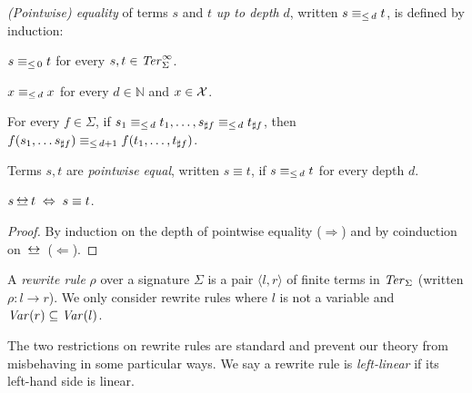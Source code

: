 \begin{definition}\label{def:equiv}%
\emph{(Pointwise) equality} of terms $s$ and $t$ \emph{up to depth} $d$,
written $s \equiv_{\le \, d} t$, is defined by induction:
\begin{compactenum}
  \item $s \equiv_{\le \, 0} t$ for every $s, t \in \mathit{Ter}_\Sigma^\infty$.
  \item $x \equiv_{\le \, d} x$ for every $d \in \mathbb{N}$ and $x \in \mathcal{X}$.
  \item For every $f \in \Sigma$, if $s_1 \equiv_{\le \, d} t_1, \ldots,
    s_{\sharp f} \equiv_{\le \, d} t_{\sharp f}$, then $f(s_1, \ldots
    s_{\sharp f}) \equiv_{\le \, d+1} f(t_1, \ldots, t_{\sharp f})$.
\end{compactenum}
Terms $s, t$ are \emph{pointwise equal}, written $s \equiv t$, if $s
\equiv_{\le \, d} t$ for every depth $d$.
\end{definition}

\begin{proposition}\label{prop:equalities}
$s \bis t \; \Leftrightarrow \; s \equiv t$.
\end{proposition}
\begin{proof}
By induction on the depth of pointwise equality ($\Rightarrow$) and
by coinduction on $\bis$ ($\Leftarrow$).
\end{proof}

\begin{definition}%
  A \emph{rewrite rule} $\rho$ over a signature $\Sigma$ is a pair
  $\langle l, r \rangle$ of finite terms in $\mathit{Ter}_\Sigma$ (written $\rho : l
  \rightarrow r$). We only consider rewrite rules where $l$
  is not a variable and $\mathit{Var}(r) \subseteq \mathit{Var}(l)$.
\end{definition}

The two restrictions on rewrite rules are standard and prevent our
theory from misbehaving in some particular ways. We say a rewrite rule
is \emph{left-linear} if its left-hand side is linear.


